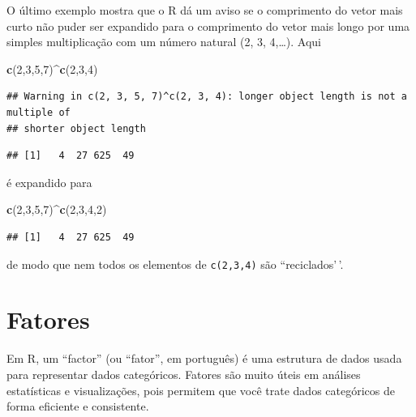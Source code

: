 \documentclass[
]{book}
\newenvironment{Shaded}{\begin{snugshade}}{\end{snugshade}}
\newcommand{\DecValTok}[1]{\textcolor[rgb]{0.00,0.00,0.81}{#1}}
\newcommand{\FunctionTok}[1]{\textcolor[rgb]{0.13,0.29,0.53}{\textbf{#1}}}
\newcommand{\NormalTok}[1]{#1}
\newcommand{\SpecialCharTok}[1]{\textcolor[rgb]{0.81,0.36,0.00}{\textbf{#1}}}
\theoremstyle{definition}
\theoremstyle{definition}
\theoremstyle{definition}
\theoremstyle{definition}
\theoremstyle{remark}
\begin{document}
O último exemplo mostra que o R dá um aviso se o comprimento do vetor mais curto não puder ser expandido para o comprimento do vetor mais longo por uma simples multiplicação com um número natural (2, 3, 4,\ldots). Aqui

\begin{Shaded}
\begin{Highlighting}[]
\FunctionTok{c}\NormalTok{(}\DecValTok{2}\NormalTok{,}\DecValTok{3}\NormalTok{,}\DecValTok{5}\NormalTok{,}\DecValTok{7}\NormalTok{)}\SpecialCharTok{\^{}}\FunctionTok{c}\NormalTok{(}\DecValTok{2}\NormalTok{,}\DecValTok{3}\NormalTok{,}\DecValTok{4}\NormalTok{)}
\end{Highlighting}
\end{Shaded}

\begin{verbatim}
## Warning in c(2, 3, 5, 7)^c(2, 3, 4): longer object length is not a multiple of
## shorter object length
\end{verbatim}

\begin{verbatim}
## [1]   4  27 625  49
\end{verbatim}

é expandido para

\begin{Shaded}
\begin{Highlighting}[]
\FunctionTok{c}\NormalTok{(}\DecValTok{2}\NormalTok{,}\DecValTok{3}\NormalTok{,}\DecValTok{5}\NormalTok{,}\DecValTok{7}\NormalTok{)}\SpecialCharTok{\^{}}\FunctionTok{c}\NormalTok{(}\DecValTok{2}\NormalTok{,}\DecValTok{3}\NormalTok{,}\DecValTok{4}\NormalTok{,}\DecValTok{2}\NormalTok{)}
\end{Highlighting}
\end{Shaded}

\begin{verbatim}
## [1]   4  27 625  49
\end{verbatim}

de modo que nem todos os elementos de \verb|c(2,3,4)| são ``reciclados'\,'.

\chapter{Fatores}\label{fatores}

Em R, um ``factor'' (ou ``fator'', em português) é uma estrutura de dados usada para representar dados categóricos. Fatores são muito úteis em análises estatísticas e visualizações, pois permitem que você trate dados categóricos de forma eficiente e consistente.
\end{document}
